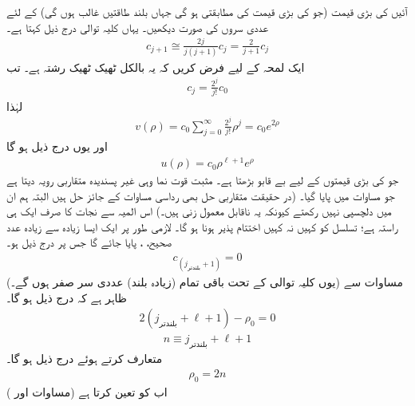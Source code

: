  آئیں  کی بڑی قیمت (جو  کی بڑی قیمت کی مطابقتی ہو گی جہاں بلند طاقتیں غالب ہوں گی) کے لئے عددی سروں کی صورت دیکھیں۔ یہاں کلیہ توالی درج ذیل کہتا ہے۔
\begin{align*}
c_{j+1}\cong\frac{2j}{j(j+1)}c_{j}=\frac{2}{j+1}c_{j} 
\end{align*}
ایک لمحہ کے لیے فرض کریں کہ یہ بالکل ٹھیک ٹھیک رشتہ ہے۔ تب 
\begin{align}
c_{j}=\frac{2^{j}}{j!}c_{0} 
\end{align}
لہٰذا
\begin{align*}
v(\rho)=c_{0}\sum_{j=0}^{\infty}\frac{2^{j}}{j!}\rho^{j}=c_{0}e^{2\rho} 
\end{align*}
 اور یوں درج ذیل ہو گا
\begin{align}
u(\rho)=c_{0}\rho^{\ell+1}e^{\rho} 
\end{align}
 جو  کی بڑی قیمتوں کے لیے بے قابو بڑھتا ہے۔ مثبت قوت نما وہی غیر پسندیدہ متقاربی رویہ دیتا ہے جو مساوات  میں پایا گیا۔ (در حقیقت متقاربی حل بھی رداسی مساوات کے جائز حل ہیں البتہ ہم ان میں دلچسپی نہیں رکھتے کیونکہ یہ ناقابل معمول زنی ہیں۔) اس المیہ سے نجات کا صرف ایک ہی راستہ ہے؛ تسلسل کو کہیں نہ کہیں اختتام پذیر ہونا ہو گا۔ لازمی طور پر ایک ایسا زیادہ سے زیادہ عدد صحیح، ، پایا جائے گا جس پر درج ذیل ہو۔
 \begin{align}
c_{(j_{\text{بلندتر}}+1)}=0
\end{align}
 (یوں کلیہ توالی کے تحت باقی تمام (زیادہ بلند) عددی سر صفر ہوں گے۔) مساوات  سے ظاہر ہے کہ درج ذیل ہو گا۔
 \begin{align*}
2(j_{\text{بلندتر}}+\ell+1)-\rho_{0}=0 
\end{align*}
 \begin{align}\label{مساوات_ابعادی_صدر_کوانٹائی_عدد}
n\equiv j_{\text{بلندتر}}+\ell+1 
\end{align}
 متعارف کرتے ہوئے درج ذیل ہو گا۔
 \begin{align}\label{مساوات_ابعادی_رو_این}
\rho_{0}=2n 
\end{align}
 اب  کو  تعین کرتا ہے (مساوات  اور )
